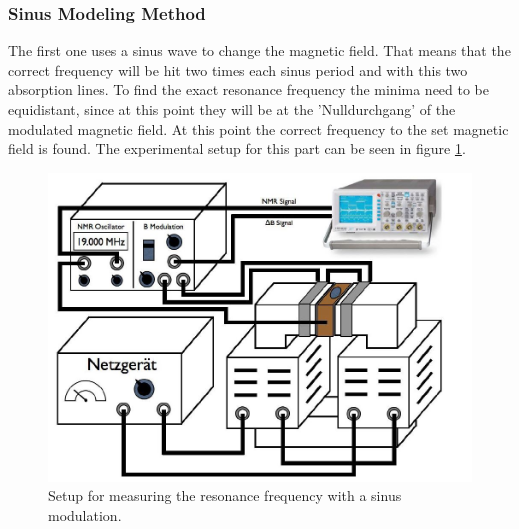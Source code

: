 \subsubsection{Sinus Modeling Method}
The first one uses a sinus wave to change the magnetic field. That means that the correct frequency will be hit two times each sinus period and with this two absorption lines. To find the exact resonance frequency the minima need to be equidistant, since at this point they will be at the 'Nulldurchgang' of the modulated magnetic field. At this point the correct frequency to the set magnetic field is found. The experimental setup for this part can be seen in figure \ref{Exp_part1}.
\begin{figure}[h]
	\includegraphics[scale=1]{Bild/Setup1}
	\centering
	\caption[Block Diagram for Setup 1]{Setup for measuring the resonance frequency with a sinus modulation.}
	\label{Exp_part1}
\end{figure}
